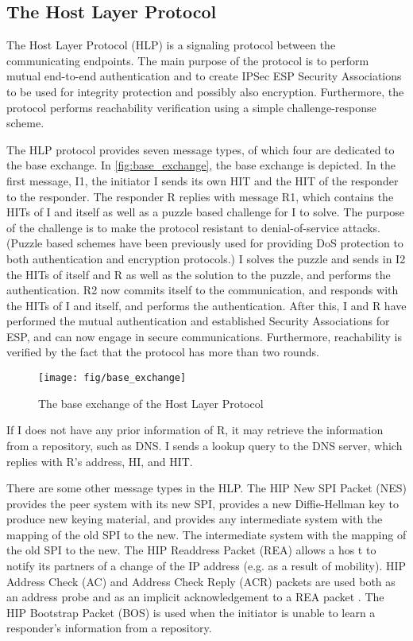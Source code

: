\subsection{The Host Layer Protocol}

The Host Layer Protocol (HLP) is a signaling protocol between the
communicating endpoints. The main purpose of the protocol is to
perform mutual end-to-end authentication and to create IPSec ESP
\cite{rfc2406} Security Associations to be used for integrity
protection and possibly also encryption. Furthermore, the protocol
performs reachability verification using a simple challenge-response
scheme.

The HLP protocol provides seven message types, of which four are
dedicated to the base exchange. In \autoref{fig:base_exchange}, the
base exchange is depicted. In the first message, I1, the initiator I
sends its own HIT and the HIT of the responder to the responder. The
responder R replies with message R1, which contains the HITs of I and
itself as well as a puzzle based challenge for I to solve. The purpose
of the challenge is to make the protocol resistant to
denial-of-service attacks. (Puzzle based schemes have been previously
used for providing DoS protection to both authentication
\cite{clientpuzzle} and encryption \cite{opportkey} protocols.) I
solves the puzzle and sends in I2 the HITs of itself and R as well as
the solution to the puzzle, and performs the authentication. R2 now
commits itself to the communication, and responds with the HITs of I
and itself, and performs the authentication. After this, I and R have
performed the mutual authentication and established Security
Associations for ESP, and can now engage in secure
communications. Furthermore, reachability is verified by the fact that
the protocol has more than two rounds.

\begin{figure}[htt]
\begin{center}
\texttt{[image: fig/base\_exchange]}
\end{center}
\caption{The base exchange of the Host Layer Protocol}
\label{fig:base_exchange}
\end{figure}

If I does not have any prior information of R, it may retrieve the
information from a repository, such as DNS. I sends a lookup query to
the DNS server, which replies with R's address, HI, and HIT.

There are some other message types in the HLP. The HIP New SPI Packet
(NES) provides the peer system with its new SPI, provides a new
Diffie-Hellman key to produce new keying material, and provides any
intermediate system with the mapping of the old SPI to the new.  The
intermediate system with the mapping of the old SPI to the new. The
HIP Readdress Packet (REA) allows a hos t to notify its partners of a
change of the IP address (e.g. as a result of mobility). HIP Address
Check (AC) and Address Check Reply (ACR) packets are used both as an
address probe and as an implicit acknowledgement to a REA packet
\cite{hip-mm}. The HIP Bootstrap Packet (BOS) is used when the
initiator is unable to learn a responder's information from a
repository.

